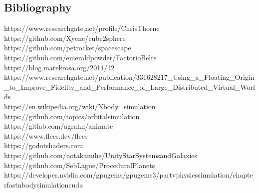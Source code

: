 \documentclass[12pt, DIV=calc]{scrartcl}
\begin{document}
\subsection{Bibliography}


https://www.researchgate.net/profile/Chris\-Thorne \\
https://github.com/Xyene/cube2sphere \\
https://github.com/petrocket/spacescape \\
https://github.com/emeraldpowder/FactorioBelts \\
https://blog.marekrosa.org/2014/12 \\
https://www.researchgate.net/publication/331628217\_Using\_a\_Floating\_Origin\_to\_Improve\_Fidelity\_and\_Performance\_of\_Large\_Distributed\_Virtual\_Worlds \\
https://en.wikipedia.org/wiki/N\-body\_simulation \\
https://github.com/topics/orbital\-simulation \\
https://gitlab.com/agrahn/animate \\
https://www.flecs.dev/flecs \\
https://godotshaders.com \\
https://github.com/notakamihe/Unity\-Star\-Systems\-and\-Galaxies \\
https://github.com/SebLague/Procedural\-Planets \\
https://developer.nvidia.com/gpugems/gpugems3/part\-v\-physics\-simulation/chapter\-fast\-n\-body\-simulation\-cuda \\
\end{document}

